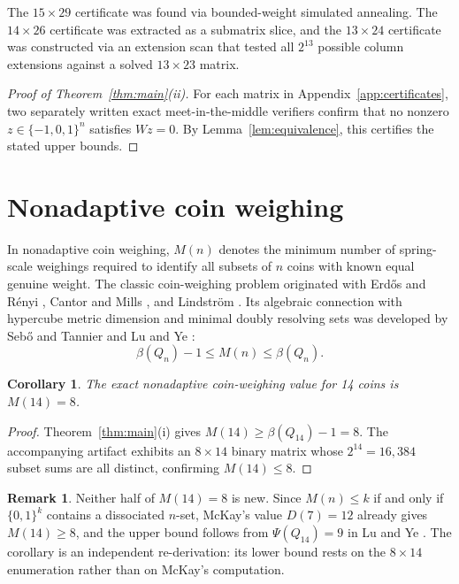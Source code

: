 \documentclass[11pt]{article}
\theoremstyle{plain}
\newtheorem{corollary}[theorem]{Corollary}
\theoremstyle{definition}
\newtheorem{remark}[theorem]{Remark}
\newcommand{\ternary}{\{-1,0,1\}}
\begin{document}
The $15 \times 29$ certificate was found via bounded-weight simulated annealing. The $14 \times 26$ certificate was extracted as a submatrix slice, and the $13 \times 24$ certificate was constructed via an extension scan that tested all $2^{13}$ possible column extensions against a solved $13 \times 23$ matrix.

\begin{proof}[Proof of Theorem~\ref{thm:main}(ii)]
For each matrix in Appendix~\ref{app:certificates}, two separately written exact meet-in-the-middle verifiers confirm that no nonzero $z \in \ternary^n$ satisfies $Wz = 0$. By Lemma~\ref{lem:equivalence}, this certifies the stated upper bounds.
\end{proof}

\section{Nonadaptive coin weighing}\label{sec:weighing}

In nonadaptive coin weighing, $M(n)$ denotes the minimum number of spring-scale weighings required to identify all subsets of $n$ coins with known equal genuine weight. The classic coin-weighing problem originated with Erd\H{o}s and R\'enyi \cite{erdosrenyi1963}, Cantor and Mills \cite{cantormills1966}, and Lindstr\"om \cite{lindstrom1969}. Its algebraic connection with hypercube metric dimension and minimal doubly resolving sets was developed by Seb\H{o} and Tannier \cite{sebotannier2004} and Lu and Ye \cite{luye2022}:
\[
  \beta(Q_n) - 1 \le M(n) \le \beta(Q_n).
\]

\begin{corollary}
The exact nonadaptive coin-weighing value for 14 coins is $M(14) = 8$.
\end{corollary}

\begin{proof}
Theorem~\ref{thm:main}(i) gives $M(14) \ge \beta(Q_{14}) - 1 = 8$. The accompanying artifact \cite{artifact} exhibits an $8 \times 14$ binary matrix whose $2^{14} = 16{,}384$ subset sums are all distinct, confirming $M(14) \le 8$.
\end{proof}

\begin{remark}
Neither half of $M(14) = 8$ is new. Since $M(n) \le k$ if and only if $\{0,1\}^k$ contains a dissociated $n$-set, McKay's value $D(7) = 12$ \cite{mckaydata} already gives $M(14) \ge 8$, and the upper bound follows from $\Psi(Q_{14}) = 9$ in Lu and Ye \cite{luye2022}. The corollary is an independent re-derivation: its lower bound rests on the $8\times14$ enumeration rather than on McKay's computation.
\end{remark}
\end{document}
